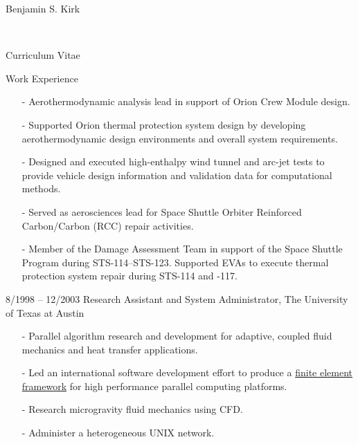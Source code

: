 \documentclass[10pt]{report}
\begin{document}
\begin{cv}{\centerline{\Large Benjamin S. Kirk}\\
    \centerline{\large Curriculum Vitae}}
\begin{cvlist}{Work Experience}
\begin{itemize}
        \item[-]
          Aerothermodynamic analysis lead in support of Orion Crew Module design.
        \item[-]
          Supported Orion thermal protection system design by developing aerothermodynamic 
          design environments and overall system requirements.
        \item[-]
          Designed and executed high-enthalpy wind tunnel and arc-jet tests to provide 
          vehicle design information and validation data for computational methods.
        \item[-] 
          Served as aerosciences lead for Space Shuttle Orbiter Reinforced Carbon/Carbon (RCC) 
          repair activities.
        \item[-]
          Member of the Damage Assessment Team in support of the Space Shuttle Program 
          during STS-114--STS-123.  Supported EVAs to execute thermal protection system 
          repair during STS-114 and -117.
      \end{itemize}

    \item[8/1998 -- 12/2003]
      Research Assistant and System Administrator, The University of Texas at Austin
      \begin{itemize}
	\item[-]
	  Parallel algorithm research and development for adaptive,
	  coupled fluid mechanics and heat transfer applications.
	\item[-]
	  Led an international software development effort to produce
          a \href{http://libmesh.sourceforge.net}{finite element framework}
	  for high performance parallel computing platforms.
	\item[-]
	  Research microgravity fluid mechanics using CFD.
	\item[-]
	  Administer a heterogeneous UNIX network.
      \end{itemize}


\end{cvlist}
\end{cv}
\end{document}
